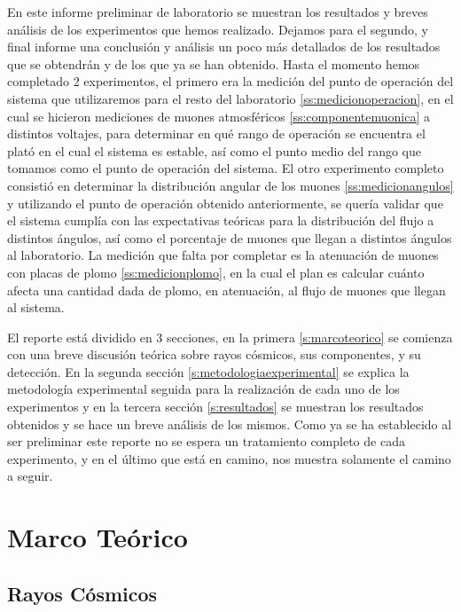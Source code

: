 \documentclass[a4paper,10pt]{article}
\numberwithin{equation}{section}
\begin{document}
\vspace{.3cm}

En este informe preliminar de laboratorio se muestran los resultados y breves análisis 
de los experimentos que hemos realizado. Dejamos para el segundo, y final informe una 
conclusión y análisis un poco más detallados de los resultados que se obtendrán y de 
los que ya se han obtenido. Hasta el momento hemos completado 2 experimentos, 
el primero era la medición del punto de operación del sistema que utilizaremos 
para el resto del laboratorio \eqref{ss:medicionoperacion}, en el cual se hicieron mediciones de muones atmosféricos 
\eqref{ss:componentemuonica} a distintos voltajes, para determinar en qué rango 
de operación se encuentra el plató en el cual el sistema es estable, así como 
el punto medio del rango que tomamos como el punto de operación del sistema. El otro experimento 
completo consistió en determinar la distribución angular de los muones \eqref{ss:medicionangulos} y utilizando 
el punto de operación obtenido anteriormente, se quería validar que el sistema 
cumplía con las expectativas teóricas para la distribución del flujo a distintos 
ángulos, así como el porcentaje de muones que llegan a distintos ángulos al 
laboratorio. La medición que falta por completar es la atenuación de muones con 
placas de plomo \eqref{ss:medicionplomo}, en la cual el plan es calcular cuánto afecta una cantidad dada 
de plomo, en atenuación, al flujo de muones que llegan al sistema.

\vspace{.3cm}

El reporte está dividido en 3 secciones, en la primera \eqref{s:marcoteorico} se comienza con una breve discusión 
teórica sobre rayos cósmicos, sus componentes, y su detección. En la segunda sección 
\eqref{s:metodologiaexperimental} se explica la metodología experimental seguida para la realización de cada uno de los 
experimentos y en la tercera sección \eqref{s:resultados} se muestran los resultados obtenidos y se 
hace un breve análisis de los mismos. Como ya se ha establecido al ser preliminar 
este reporte no se espera un tratamiento completo de cada experimento, y en el 
último que está en camino, nos muestra solamente el camino a seguir.

\section{Marco Teórico}
\label{s:marcoteorico}

\subsection{Rayos Cósmicos}
\end{document}
